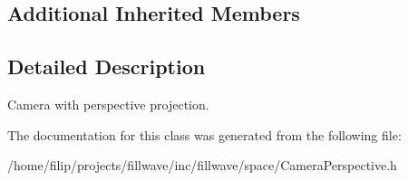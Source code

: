 \subsection*{Additional Inherited Members}


\subsection{Detailed Description}
Camera with perspective projection. 

The documentation for this class was generated from the following file\+:\begin{DoxyCompactItemize}
\item 
/home/filip/projects/fillwave/inc/fillwave/space/Camera\+Perspective.\+h\end{DoxyCompactItemize}
